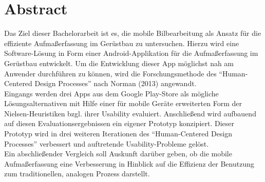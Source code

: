 \chapter*{\centering Abstract}
Das Ziel dieser Bachelorarbeit ist es, die mobile Bilbearbeitung als Ansatz für die effiziente Aufmaßerfassung im Gerüstbau zu untersuchen.
Hierzu wird eine Software-Lösung in Form einer Android-Applikation für die Aufmaßerfassung im Gerüstbau entwickelt.
Um die Entwicklung dieser App möglichst nah am Anwender durchführen zu können, wird die Forschungsmethode des ``Human-Centered Design Processes'' nach Norman (2013) angewandt. \\

Eingangs werden drei Apps aus dem Google Play-Store als mögliche Lösungsalternativen mit Hilfe einer für mobile Geräte erweiterten Form der Nielsen-Heuristiken bzgl. ihrer Usability evaluiert.
Anschließend wird aufbauend auf diesen Evaluationsergebnissen ein eigener Prototyp konzipiert.
Dieser Prototyp wird in drei weiteren Iterationen des ``Human-Centered Design Processes'' verbessert und auftretende Usability-Probleme gelöst.  \\

Ein abschließender Vergleich soll Auskunft darüber geben, ob die mobile Aufmaßerfassung eine Verbesserung in Hinblick auf die Effizienz der Benutzung zum traditionellen, analogen Prozess darstellt.
